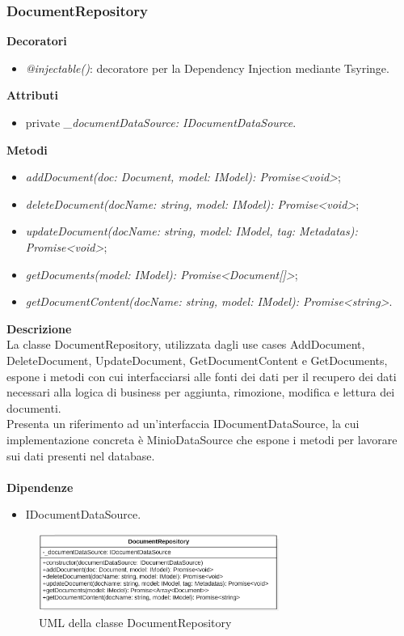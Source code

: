 \subsubsection{DocumentRepository}
\textbf{Decoratori}
\begin{itemize}
    \item \textit{@injectable()}: decoratore per la Dependency Injection mediante Tsyringe.
\end{itemize}
\textbf{Attributi}
\begin{itemize}
    \item private \textit{\_documentDataSource: IDocumentDataSource}.
\end{itemize}
\textbf{Metodi}
\begin{itemize}[itemsep=-4pt]
    \item \textit{addDocument(doc: Document, model: IModel): Promise<void>};
    \item \textit{deleteDocument(docName: string, model: IModel): Promise<void>};
    \item \textit{updateDocument(docName: string, model: IModel, tag: Metadatas): Promise<void>};
    \item \textit{getDocuments(model: IModel): Promise<Document[]>};
    \item \textit{getDocumentContent(docName: string, model: IModel): Promise<string>}. 
\end{itemize}
\textbf{Descrizione}\\
La classe DocumentRepository, utilizzata dagli use cases AddDocument, DeleteDocument, UpdateDocument, GetDocumentContent e GetDocuments, espone i metodi con cui interfacciarsi alle fonti dei dati per il recupero dei dati necessari alla logica di business per aggiunta, rimozione, modifica e lettura dei documenti.\\
Presenta un riferimento ad un'interfaccia IDocumentDataSource, la cui implementazione concreta è MinioDataSource che espone i metodi per lavorare sui dati presenti nel database.\\ \\
\textbf{Dipendenze}
\begin{itemize}
    \item IDocumentDataSource.
\end{itemize}

\begin{figure}[h!]
    \centering  
    \includegraphics[width=0.7\textwidth]{DocumentRepository.png}
    \caption{UML della classe DocumentRepository}
\end{figure}

